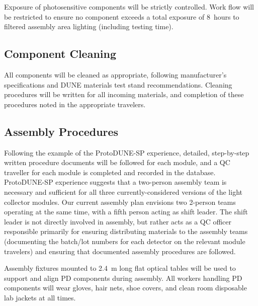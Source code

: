 
Exposure of photosensitive components will be strictly controlled.  Work flow will be restricted to ensure no component exceeds a total exposure of \SI{8}{hours} to filtered assembly area lighting (including testing time).

\subsection{Component Cleaning}

All components will be cleaned  as appropriate, following manufacturer's specifications and DUNE materials test stand recommendations.  Cleaning procedures will be written for all incoming materials, and completion of these procedures noted in the appropriate travelers.

\subsection{Assembly Procedures}

Following the example of the ProtoDUNE-SP experience, detailed, step-by-step written procedure documents will be followed for each module, and a QC traveller for each module is completed and recorded in the database.  ProtoDUNE-SP experience suggests that a two-person assembly team is necessary and sufficient for all three currently-considered versions of the light collector modules.  Our current assembly plan envisions two 2-person teams operating at the same time, with a fifth person acting as shift leader.  The shift leader is not directly involved in assembly, but rather acts as a QC officer responsible primarily for ensuring distributing materials to the assembly teams (documenting the batch/lot numbers for each detector on the relevant module travelers) and ensuring that documented assembly procedures are followed.

Assembly fixtures mounted to \SI{2.4}{m} long flat optical tables will be used to support and align PD components during assembly.  All workers handling PD components will wear gloves, hair nets, shoe covers, and clean room disposable lab jackets at all times.



